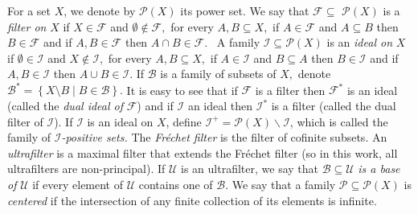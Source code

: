 \documentclass{article}%
\begin{document}
For a set $X$, we denote by $\mathcal{P}\left(  X\right)  $ its power set. We
say that $\mathcal{F\subseteq}$ $\mathcal{P}\left(  X\right)  $ is a
\emph{filter on }$X$ if $X\in\mathcal{F}$ and $\emptyset\notin\mathcal{F},$
for every $A,B\subseteq X,$ if $A\in\mathcal{F}$ and $A\subseteq B$ then
$B\in\mathcal{F}$ and if $A,B\in\mathcal{F}$ then $A\cap B\in\mathcal{F}.$ \ A
family $\mathcal{I}\subseteq\mathcal{P}\left(  X\right)  $ is an \emph{ideal
on }$X$ if $\emptyset\in\mathcal{I}$ and $X\notin\mathcal{I},$ for every
$A,B\subseteq X,$ if $A\in\mathcal{I}$ and $B\subseteq A$ then $B\in
\mathcal{I}$ and if $A,B\in\mathcal{I}$ then $A\cup B\in\mathcal{I}.$ If
$\mathcal{B}$ is a family of subsets of $X,$ denote $\mathcal{B}^{\ast
}=\left\{  X\setminus B\mid B\in\mathcal{B}\right\}  .$ It is easy to see that
if $\mathcal{F}$ is a filter then $\mathcal{F}^{\ast}$ is an ideal (called the
\emph{dual ideal of }$\mathcal{F}$) and if $\mathcal{I}$ an ideal then
$\mathcal{I}^{\ast}$ is a filter (called the dual filter of $\mathcal{I}$). If
$\mathcal{I}$ is an ideal on $X$, define $\mathcal{I}^{+}=\mathcal{P}\left(
X\right)  \smallsetminus\mathcal{I}$, which is called the family of
$\mathcal{I}$\emph{-positive sets. }The \emph{Fr\'{e}chet filter }is the
filter of cofinite subsets$.$ An \emph{ultrafilter} is a maximal filter that
extends the Fr\'{e}chet filter (so in this work, all ultrafilters are
non-principal). If $\mathcal{U}$ is an ultrafilter, we say that
$\mathcal{B\subseteq U}$ \emph{is a base of }$\mathcal{U}$ if every element of
$\mathcal{U}$ contains one of $\mathcal{B}.$ We say that a family
$\mathcal{P\subseteq P}\left(  X\right)  $ is \emph{centered }if the
intersection of any finite collection of its elements is infinite.

\qquad\ \qquad\ \ \ \ 
\end{document}
